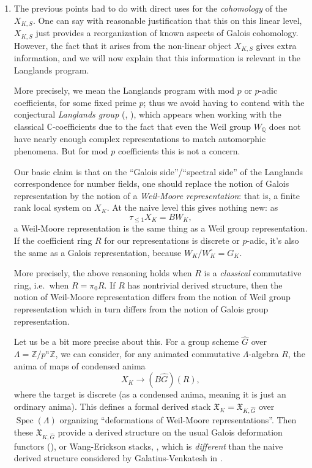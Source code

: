 \documentclass[12pt]{article}
\theoremstyle{definition}
\newcommand{\on}{\operatorname}
\newcommand{\mbb}{\mathbb}
\newcommand{\wh}{\widehat}
\begin{document}
\begin{enumerate}
\item The previous points had to do with direct uses for the \emph{cohomology} of the $X_{K,S}$.  One can say with reasonable justification that this on this linear level, $X_{K,S}$ just provides a reorganization of known aspects of Galois cohomology.  However, the fact that it arises from the non-linear object $X_{K,S}$ gives extra information, and we will now explain that this information is relevant in the Langlands program.

More precisely, we mean the Langlands program with mod $p$ or $p$-adic coefficients, for some fixed prime $p$; thus we avoid having to contend with the conjectural \emph{Langlands group} (\cite{langlands}, \cite{arthur}), which appears when working with the classical $\mathbb{C}$-coefficients due to the fact that even the Weil group $W_\mbb{Q}$ does not have nearly enough complex representations to match automorphic phenomena.  But for mod $p$ coefficients this is not a concern.

Our basic claim is that on the ``Galois side''/``spectral side'' of the Langlands correspondence for number fields, one should replace the notion of Galois representation by the notion of a \emph{Weil-Moore representation}: that is, a finite rank local system on $X_K$.  At the naive level this gives nothing new: as
$$\tau_{\leq 1}X_K = BW_K,$$
a Weil-Moore representation is the same thing as a Weil group representation.  If the coefficient ring $R$ for our representations is discrete or $p$-adic, it's also the same as a Galois representation, because $W_K/W_K^\circ = G_K$.

More precisely, the above reasoning holds when $R$ is a \emph{classical} commutative ring, i.e.\ when $R=\pi_0R$.  If $R$ has nontrivial derived structure, then the notion of Weil-Moore representation differs from the notion of Weil group representation which in turn differs from the notion of Galois group representation.

Let us be a bit more precise about this.  For a group scheme $\wh{G}$ over $\Lambda=\mbb{Z}/p^n\mbb{Z}$, we can consider, for any animated commutative $\Lambda$-algebra $R$, the anima of maps of condensed anima
$$X_K \to (B\wh{G})(R),$$
where the target is discrete (as a condensed anima, meaning it is just an ordinary anima).  This defines a formal derived stack $\mathfrak{X}_{K}=\mathfrak{X}_{K,\wh{G}}$ over $\on{Spec}(\Lambda)$ organizing ``deformations of Weil-Moore representations''.  Then these $\mathfrak{X}_{K,\wh{G}}$ provide a derived structure on the usual Galois deformation functors (\cite{mazur}), or Wang-Erickson stacks, \cite{carlwe}, which is \emph{different} than the naive derived structure considered by Galatius-Venkatesh in \cite{galatius}.


\end{enumerate}
\end{document}
